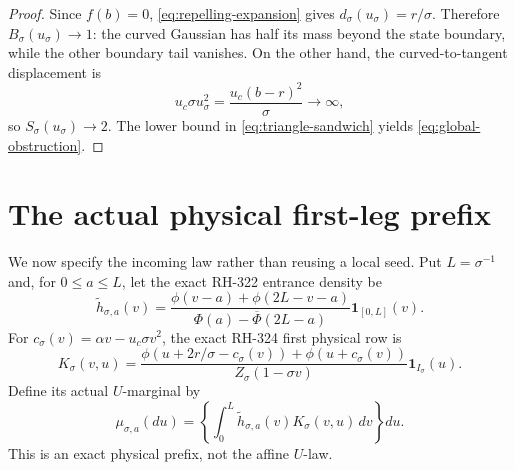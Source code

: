\documentclass[11pt]{article}
\theoremstyle{definition}
\theoremstyle{remark}
\newcommand{\1}{\mathbf 1}
\begin{document}
\begin{proof}
Since $f(b)=0$, \eqref{eq:repelling-expansion} gives
$d_\sigma(u_\sigma)=r/\sigma$.  Therefore
$B_\sigma(u_\sigma)\to1$: the curved Gaussian has half its mass beyond the
state boundary, while the other boundary tail vanishes.  On the other hand,
the curved-to-tangent displacement is
\[
 u_c\sigma u_\sigma^2=\frac{u_c(b-r)^2}{\sigma}\longrightarrow\infty,
\]
so $S_\sigma(u_\sigma)\to2$.  The lower bound in
\eqref{eq:triangle-sandwich} yields \eqref{eq:global-obstruction}.
\end{proof}

\section{The actual physical first-leg prefix}

We now specify the incoming law rather than reusing a local seed.  Put
$L=\sigma^{-1}$ and, for $0\le a\le L$, let the exact RH-322 entrance
density be
\begin{equation}\label{eq:finite-seed}
 \widetilde h_{\sigma,a}(v)=
 \frac{\phi(v-a)+\phi(2L-v-a)}
 {\Phi(a)-\overline\Phi(2L-a)}\1_{[0,L]}(v).
\end{equation}
For $c_\sigma(v)=\alpha v-u_c\sigma v^2$, the exact RH-324 first physical
row is
\begin{equation}\label{eq:first-row}
 K_\sigma(v,u)=
 \frac{
 \phi(u+2r/\sigma-c_\sigma(v))+\phi(u+c_\sigma(v))}
 {Z_\sigma(1-\sigma v)}\1_{I_\sigma}(u).
\end{equation}
Define its actual $U$-marginal by
\begin{equation}\label{eq:actual-prefix}
 \mu_{\sigma,a}(du)=
 \left\{\int_0^L\widetilde h_{\sigma,a}(v)
 K_\sigma(v,u)\,dv\right\}du.
\end{equation}
This is an exact physical prefix, not the affine $U$-law.
\end{document}
